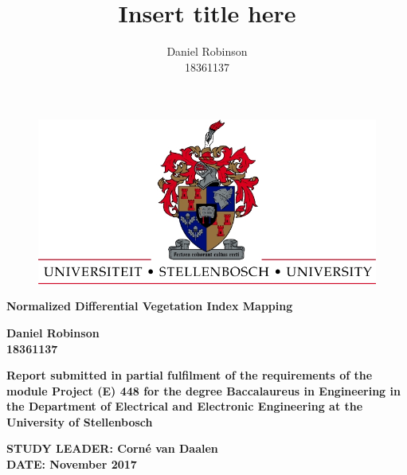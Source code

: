 


\title{Insert title here}
\author{Daniel Robinson\\18361137}


    \begin{titlepage}
        \begin{center}
            \vspace*{1cm}
            
            \begin{figure}
			\centering
            \includegraphics[scale=2]{images/UScrest-top.jpg}
            \end{figure}
            
            \huge
            \textbf{Normalized Differential Vegetation Index Mapping}

            \large            
            \vspace{2.5cm}

            \textbf{Daniel Robinson\\18361137}

            \vspace{2.5cm}    
            
            \textbf{Report submitted in partial fulfilment of the requirements of the module Project (E) 448
            for the degree Baccalaureus in Engineering in the Department of Electrical and Electronic
            Engineering at the University of Stellenbosch}
            
            \vspace{4cm} 
            
            \textbf{STUDY LEADER: Corné van Daalen\\DATE: November 2017}
            
            
        \end{center}
\end{titlepage}


